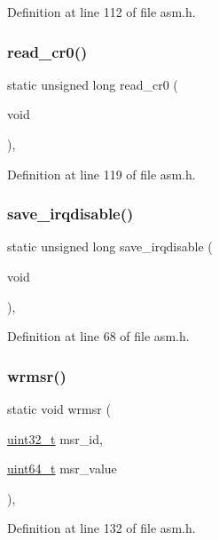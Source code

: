 Definition at line 112 of file asm.\+h.

\mbox{\label{a00014_ac85e095222f364961e091702bb6bc2ff_ac85e095222f364961e091702bb6bc2ff}} 
\subsubsection{\texorpdfstring{read\+\_\+cr0()}{read\_cr0()}}
{\footnotesize\ttfamily static unsigned long read\+\_\+cr0 (\begin{DoxyParamCaption}\item[{void}]{ }\end{DoxyParamCaption})\hspace{0.3cm}{\ttfamily [inline]}, {\ttfamily [static]}}



Definition at line 119 of file asm.\+h.

\mbox{\label{a00014_ab1dca2d7fd57d56f7548a81ef081ba74_ab1dca2d7fd57d56f7548a81ef081ba74}} 
\subsubsection{\texorpdfstring{save\+\_\+irqdisable()}{save\_irqdisable()}}
{\footnotesize\ttfamily static unsigned long save\+\_\+irqdisable (\begin{DoxyParamCaption}\item[{void}]{ }\end{DoxyParamCaption})\hspace{0.3cm}{\ttfamily [inline]}, {\ttfamily [static]}}



Definition at line 68 of file asm.\+h.

\mbox{\label{a00014_a368f08346121290f513a26011e0f68f8_a368f08346121290f513a26011e0f68f8}} 
\subsubsection{\texorpdfstring{wrmsr()}{wrmsr()}}
{\footnotesize\ttfamily static void wrmsr (\begin{DoxyParamCaption}\item[{\hyperlink{a00038_a435d1572bf3f880d55459d9805097f62_a435d1572bf3f880d55459d9805097f62}{uint32\+\_\+t}}]{msr\+\_\+id,  }\item[{\hyperlink{a00038_aaa5d1cd013383c889537491c3cfd9aad_aaa5d1cd013383c889537491c3cfd9aad}{uint64\+\_\+t}}]{msr\+\_\+value }\end{DoxyParamCaption})\hspace{0.3cm}{\ttfamily [inline]}, {\ttfamily [static]}}



Definition at line 132 of file asm.\+h.


